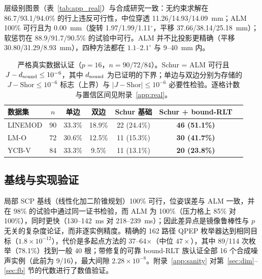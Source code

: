 层级别图景（表~\ref{tab:app_real}）与合成研究一致：无约束求解在 86.7/93.1/94.0\% 的行上违反可行性，中位穿透 11.26/14.93/14.09~mm；ALM 100\% 可行且为 0.00~mm（旋转 1.97/1.99/1.11$^\circ$，平移 37.66/38.14/25.18~mm）；软惩罚在 88.9/91.7/90.5\% 的试验中可行。ALM 并不比投影更精确（平移 30.80/31.29/8.93~mm），四种方法都在 $1.1$--$2.1^\circ$ 与 9--40~mm 内。

\begin{table}[t]
\centering
\caption{严格真实数据认证（$p=16$，$n=90/72/84$）。Schur = ALM 可行且 $J-d_{\rm sound}\le10^{-6}$，其中 $d_{\rm sound}$ 为已证明的下界；单边与双边分别为存储的 $J-\mathrm{Shor}\le10^{-6}$ 标志（上界）与 $|J-\mathrm{Shor}|\le10^{-6}$ 必要性检验。逐格计数与置信区间见附录~\ref{app:real}。}
\label{tab:rigorous}
\scriptsize
\setlength{\tabcolsep}{1.6pt}
\begin{tabular}{@{}lcccccc@{}}
\toprule
数据集 & $n$ & 单边 & 双边 & Schur 基础 & Schur + bound-RLT \\
\midrule
LINEMOD & 90 & 33.3\% & 18.9\% & 22 (24.4\%) & \textbf{46 (51.1\%)} \\
LM-O & 72 & 30.6\% & 12.5\% & 11 (15.3\%) & \textbf{30 (41.7\%)} \\
YCB-V & 84 & 33.3\% & 9.5\% & 11 (13.1\%) & \textbf{20 (23.8\%)} \\
\bottomrule
\end{tabular}
\end{table}

\subsection{基线与实现验证}\label{sec:baselines}
局部 SCP 基线（线性化加二阶锥规划）100\% 可行，位姿误差与 ALM 一致，并在 98\% 的试验中通过同一证书检验，而 ALM 为 100\%（压力格上 85\% 对 100\%），同时更快（130--142~ms 对 218--239~ms）；因此差异点是镜像鲁棒性与 $p$ 无关的复杂度论证，而非逐实例精度。精确的 162 路径 QPEP 枚举器达到相同目标（$1.8\times10^{-12}$），代价是多起点方法的 37--64$\times$（中位 $47\times$），其中 89/114 次枚举（78.1\%）找到一般 40 根；带修复的可靠 bound-RLT 族认证全部 16 个合成噪声实例（此前为 9/16），最大间隙 $2.28\times10^{-8}$。附录~\ref{app:sanity} 对第~\ref{sec:dim}--\ref{sec:fb} 节的代数进行了数值验证。

